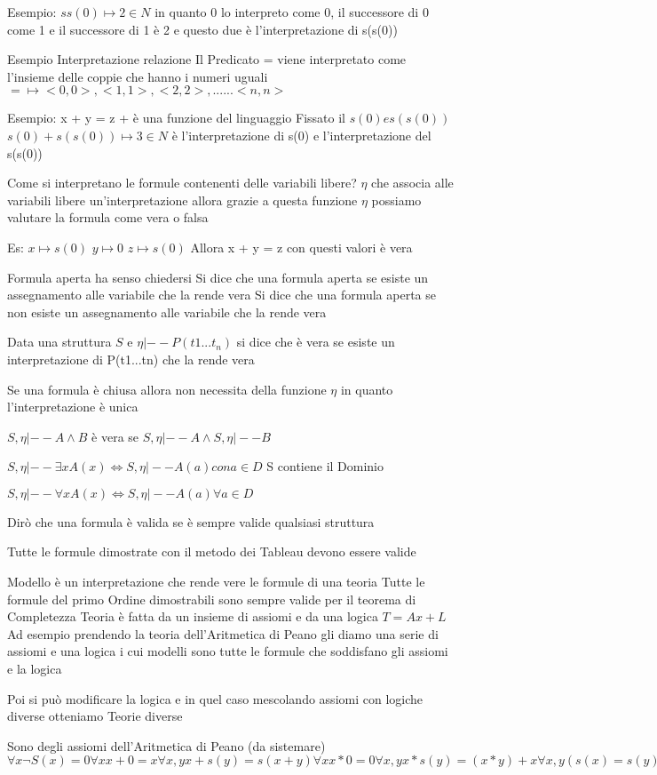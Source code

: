 Esempio:
$s s(0) \mapsto 2 \in N$ in quanto 0 lo interpreto come 0, il successore di 0 come 1 e il successore di 1 è 2 e questo due è l'interpretazione di s(s(0))

Esempio Interpretazione relazione
Il Predicato = viene interpretato come l'insieme delle coppie che hanno i numeri uguali
$= \mapsto <0,0>,<1,1>,<2,2>,......<n,n>$

Esempio: 
x + y = z    + è una funzione del linguaggio
Fissato il $s(0) e s(s(0))$
$s(0) + s(s(0)) \mapsto 3 \in N$ è l'interpretazione di s(0) e l'interpretazione del s(s(0))

Come si interpretano le formule contenenti delle variabili libere?
$\eta$ che associa alle variabili libere un'interpretazione  allora grazie a questa funzione $\eta$ possiamo valutare la formula come vera o falsa

Es:
$x \mapsto s(0)$
$y \mapsto 0$
$z \mapsto s(0)$
Allora x + y = z con questi valori è vera

Formula aperta ha senso chiedersi 
Si dice che una formula aperta    se esiste un assegnamento alle variabile che la rende vera
Si dice che una formula aperta se non esiste un assegnamento alle variabile che la rende vera

Data una struttura $S $ e $\eta |-- P(t1...t_n)$ si dice che è vera se esiste un interpretazione di P(t1...tn) che la rende vera

Se una formula è chiusa allora non necessita della funzione $\eta$ in quanto l'interpretazione è unica

$S,\eta |-- A \land B$ è vera se $S,\eta |-- A \land S,\eta |-- B$

$S,\eta |-- \exists x A(x) \iff S,\eta |-- A(a) con a \in D$  S contiene il Dominio

$S,\eta |-- \forall x A(x) \iff S,\eta |-- A(a) \forall a \in D$

Dirò che una formula è valida se è sempre valide qualsiasi struttura

Tutte le formule dimostrate con il metodo dei Tableau devono essere valide

Modello è un interpretazione che rende vere le formule di una teoria
Tutte le formule del primo Ordine dimostrabili sono sempre valide per il teorema di Completezza
Teoria è fatta da un insieme di assiomi e da una logica $T = Ax + L$
Ad esempio prendendo la teoria dell'Aritmetica di Peano gli diamo una serie di assiomi e una logica 
i cui modelli sono tutte le formule che soddisfano gli assiomi e la logica

Poi si può modificare la logica e in quel caso mescolando assiomi con logiche diverse otteniamo Teorie diverse

Sono degli assiomi dell'Aritmetica di Peano (da sistemare)
$\forall x \neg S(x) = 0
\forall x x + 0 = x
\forall x,y x + s(y) = s(x + y)
\forall x x * 0 = 0
\forall x,y x * s(y) = (x * y) + x 
\forall x,y (s(x) = s(y)) \rightarrow x = y$



